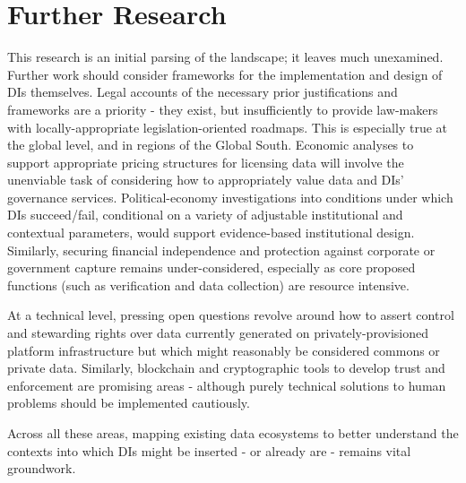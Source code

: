 \chapter*{Further Research}

This research is an initial parsing of the landscape; it leaves much unexamined. Further work should consider frameworks for the implementation and design of DIs themselves. Legal accounts of the necessary prior justifications and frameworks are a priority - they exist, but insufficiently to provide law-makers with locally-appropriate legislation-oriented roadmaps. This is especially true at the global level, and in regions of the Global South. Economic analyses to support appropriate pricing structures for licensing data will involve the unenviable task of considering how to appropriately value data and DIs' governance services. Political-economy investigations into conditions under which DIs succeed/fail, conditional on a variety of adjustable institutional and contextual parameters, would support evidence-based institutional design. Similarly, securing financial independence and protection against corporate or government capture remains under-considered, especially as core proposed functions (such as verification and data collection) are resource intensive. 

At a technical level, pressing open questions revolve around how to assert control and stewarding rights over data currently generated on privately-provisioned platform infrastructure but which might reasonably be considered commons or private data. Similarly, blockchain and cryptographic tools to develop trust and enforcement are promising areas - although purely technical solutions to human problems should be implemented cautiously.

Across all these areas, mapping existing data ecosystems to better understand the contexts into which DIs might be inserted - or already are - remains vital groundwork. 


